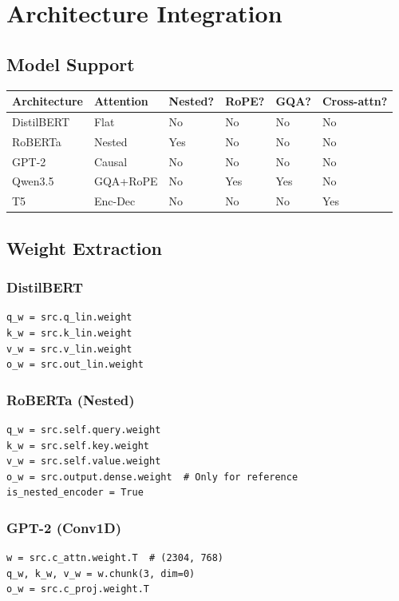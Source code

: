 \section{Architecture Integration}

\subsection{Model Support}

\begin{table}[H]
\centering
\small
\begin{tabular}{llllll}
\toprule
\textbf{Architecture} & \textbf{Attention} & \textbf{Nested?} & \textbf{RoPE?} & \textbf{GQA?} & \textbf{Cross-attn?} \\
\midrule
DistilBERT & Flat & No & No & No & No \\
RoBERTa & Nested & Yes & No & No & No \\
GPT-2 & Causal & No & No & No & No \\
Qwen3.5 & GQA+RoPE & No & Yes & Yes & No \\
T5 & Enc-Dec & No & No & No & Yes \\
\bottomrule
\end{tabular}
\end{table}

\subsection{Weight Extraction}

\subsubsection{DistilBERT}
\begin{lstlisting}
q_w = src.q_lin.weight
k_w = src.k_lin.weight
v_w = src.v_lin.weight
o_w = src.out_lin.weight
\end{lstlisting}

\subsubsection{RoBERTa (Nested)}
\begin{lstlisting}
q_w = src.self.query.weight
k_w = src.self.key.weight
v_w = src.self.value.weight
o_w = src.output.dense.weight  # Only for reference
is_nested_encoder = True
\end{lstlisting}

\subsubsection{GPT-2 (Conv1D)}
\begin{lstlisting}
w = src.c_attn.weight.T  # (2304, 768)
q_w, k_w, v_w = w.chunk(3, dim=0)
o_w = src.c_proj.weight.T
\end{lstlisting}

